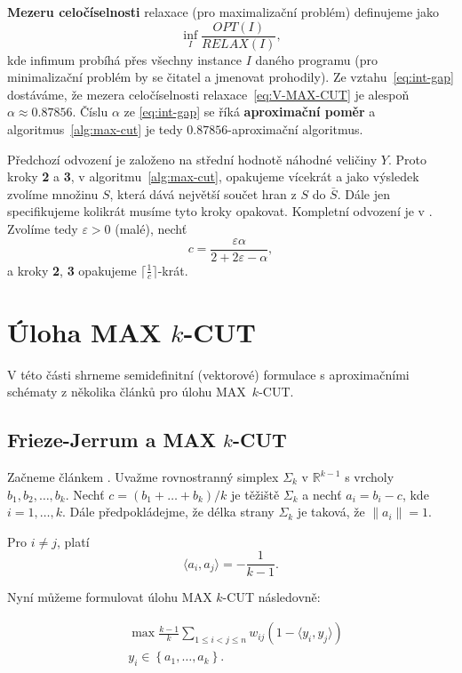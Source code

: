 \noindent \textbf{Mezeru celočíselnosti} relaxace (pro maximalizační problém) definujeme jako
$$
    \inf_{I} \frac{OPT(I)}{RELAX(I)},
$$
kde infimum probíhá přes všechny instance $I$ daného programu (pro minimalizační problém by se čitatel a jmenovat prohodily). Ze vztahu~\ref{eq:int-gap} dostáváme, že mezera celočíselnosti relaxace~\ref{eq:V-MAX-CUT} je alespoň $\alpha \approx 0.87856$. Číslu $\alpha$ ze \ref{eq:int-gap} se říká \textbf{aproximační poměr} a algoritmus~\ref{alg:max-cut} je tedy $0.87856$-aproximační algoritmus.

Předchozí odvození je založeno na střední hodnotě náhodné veličiny $Y$. Proto kroky \textbf{2} a \textbf{3}, v algoritmu~\ref{alg:max-cut}, opakujeme vícekrát a jako výsledek zvolíme množinu $S$, která dává největší součet hran z $S$ do $\bar{S}$. Dále jen specifikujeme kolikrát musíme tyto kroky opakovat. Kompletní odvození je v \cite{approximation-algorithms}. Zvolíme tedy $\varepsilon > 0$ (malé), nechť
$$
    c = \frac{\varepsilon \alpha}{2 + 2\varepsilon - \alpha},
$$
a kroky \textbf{2}, \textbf{3} opakujeme $\lceil \frac{1}{c} \rceil$-krát.


\section{Úloha MAX $k$-CUT}

V této části shrneme semidefinitní (vektorové) formulace s aproximačními schématy z několika článků pro úlohu MAX~$k$-CUT.

\subsection{Frieze-Jerrum a MAX $k$-CUT}

Začneme článkem \cite{frieze-jerrum}. Uvažme rovnostranný simplex $\Sigma_k$ v $\mathbb{R}^{k-1}$ s vrcholy $b_1, b_2, \dots, b_k$. Nechť $c = (b_1 + \dots + b_k) / k$ je těžiště $\Sigma_k$ a nechť $a_i = b_i - c$, kde $i = 1, \dots, k$. Dále předpokládejme, že délka strany $\Sigma_k$ je taková, že $\| a_i\| = 1$.

\begin{lm}\cite{frieze-jerrum}
    Pro $i \neq j$, platí
    $$
        \langle a_i, a_j \rangle = -\frac{1}{k-1}.
    $$
\end{lm}

\noindent Nyní můžeme formulovat úlohu MAX $k$-CUT následovně:

\begin{equation}\tag{FJ}
    \begin{split}
        &\max \frac{k-1}{k} \sum_{1 \leq i < j \leq n} w_{ij} (1 - \langle y_i, y_j \rangle) \\
        &y_i \in \left\{ a_1, \dots, a_k \right\}.
    \end{split}
    \label{eq:FJ}
\end{equation}

